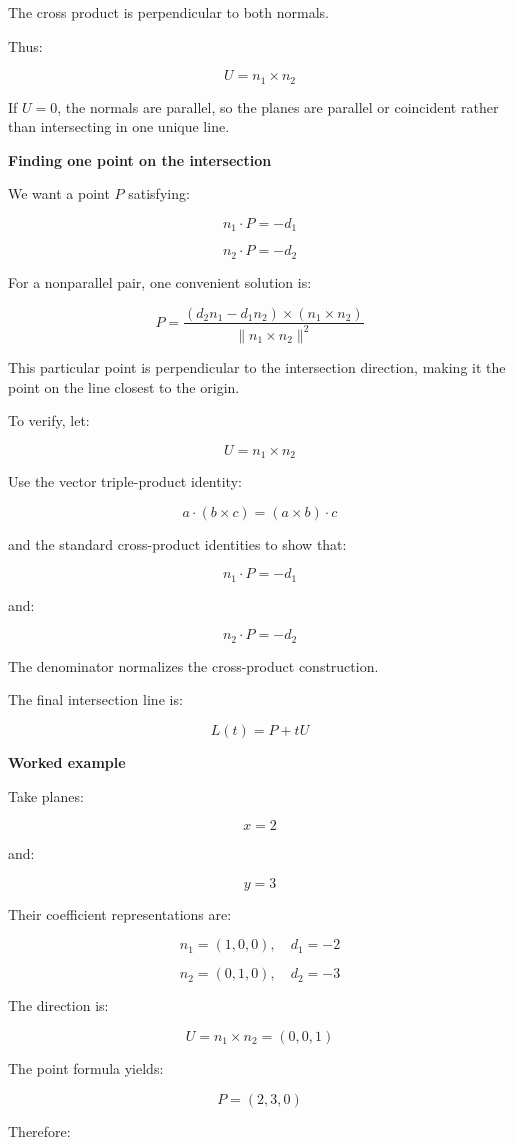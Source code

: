 The cross product is perpendicular to both normals.

Thus:

\[
\boxed{ U=n_1\times n_2 }
\]

If \(U=0\), the normals are parallel, so the planes are parallel or coincident rather than intersecting in one unique line.

\textbf{Finding one point on the intersection}

We want a point \(P\) satisfying:

\[
n_1\cdot P=-d_1
\]

\[
n_2\cdot P=-d_2
\]

For a nonparallel pair, one convenient solution is:

\[
\boxed{ P= \frac{ (d_2n_1-d_1n_2)\times(n_1\times n_2) }{ \|n_1\times n_2\|^2 } }
\]

This particular point is perpendicular to the intersection direction, making it the point on the line closest to the origin.

To verify, let:

\[
U=n_1\times n_2
\]

Use the vector triple-product identity:

\[
a\cdot(b\times c)=(a\times b)\cdot c
\]

and the standard cross-product identities to show that:

\[
n_1\cdot P=-d_1
\]

and:

\[
n_2\cdot P=-d_2
\]

The denominator normalizes the cross-product construction.

The final intersection line is:

\[
\boxed{ L(t)=P+tU }
\]

\textbf{Worked example}

Take planes:

\[
x=2
\]

and:

\[
y=3
\]

Their coefficient representations are:

\[
n_1=(1,0,0),\quad d_1=-2
\]

\[
n_2=(0,1,0),\quad d_2=-3
\]

The direction is:

\[
U=n_1\times n_2=(0,0,1)
\]

The point formula yields:

\[
P=(2,3,0)
\]

Therefore:

